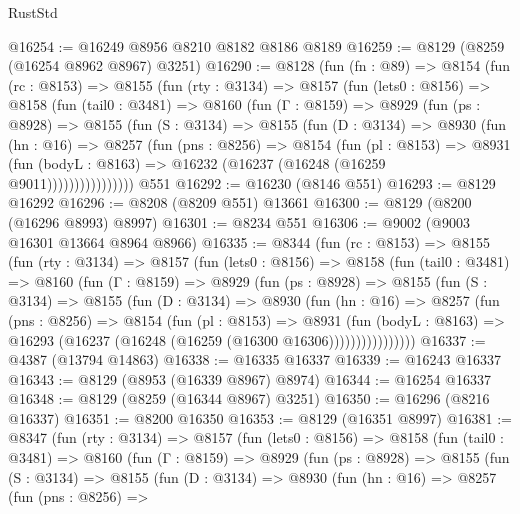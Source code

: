 \begin{lexlean}{RustStd}
\begin{coremodule}
@16254 := @16249 @8956 @8210 @8182 @8186 @8189
@16259 := @8129 (@8259 (@16254 @8962 @8967) @3251)
@16290 := @8128
    (fun (fn : @89) =>
    @8154
      (fun (rc : @8153) =>
      @8155
        (fun (rty : @3134) =>
        @8157
          (fun (lets0 : @8156) =>
          @8158
            (fun (tail0 : @3481) =>
            @8160
              (fun (Γ : @8159) =>
              @8929
                (fun (ps : @8928) =>
                @8155
                  (fun (S : @3134) =>
                  @8155
                    (fun (D : @3134) =>
                    @8930
                      (fun (hn : @16) =>
                      @8257
                        (fun (pns : @8256) =>
                        @8154
                          (fun (pl : @8153) =>
                          @8931
                            (fun (bodyL : @8163) =>
                            @16232 (@16237 (@16248 (@16259 @9011))))))))))))))))
    @551
@16292 := @16230 (@8146 @551)
@16293 := @8129 @16292
@16296 := @8208 (@8209 @551) @13661
@16300 := @8129 (@8200 (@16296 @8993) @8997)
@16301 := @8234 @551
@16306 := @9002 (@9003 @16301 @13664 @8964 @8966)
@16335 := @8344
    (fun (rc : @8153) =>
    @8155
      (fun (rty : @3134) =>
      @8157
        (fun (lets0 : @8156) =>
        @8158
          (fun (tail0 : @3481) =>
          @8160
            (fun (Γ : @8159) =>
            @8929
              (fun (ps : @8928) =>
              @8155
                (fun (S : @3134) =>
                @8155
                  (fun (D : @3134) =>
                  @8930
                    (fun (hn : @16) =>
                    @8257
                      (fun (pns : @8256) =>
                      @8154
                        (fun (pl : @8153) =>
                        @8931
                          (fun (bodyL : @8163) =>
                          @16293 (@16237 (@16248 (@16259 (@16300 @16306))))))))))))))))
@16337 := @4387 (@13794 @14863)
@16338 := @16335 @16337
@16339 := @16243 @16337
@16343 := @8129 (@8953 (@16339 @8967) @8974)
@16344 := @16254 @16337
@16348 := @8129 (@8259 (@16344 @8967) @3251)
@16350 := @16296 (@8216 @16337)
@16351 := @8200 @16350
@16353 := @8129 (@16351 @8997)
@16381 := @8347
    (fun (rty : @3134) =>
    @8157
      (fun (lets0 : @8156) =>
      @8158
        (fun (tail0 : @3481) =>
        @8160
          (fun (Γ : @8159) =>
          @8929
            (fun (ps : @8928) =>
            @8155
              (fun (S : @3134) =>
              @8155
                (fun (D : @3134) =>
                @8930
                  (fun (hn : @16) =>
                  @8257
                    (fun (pns : @8256) =>

\end{coremodule}
\end{lexlean}

